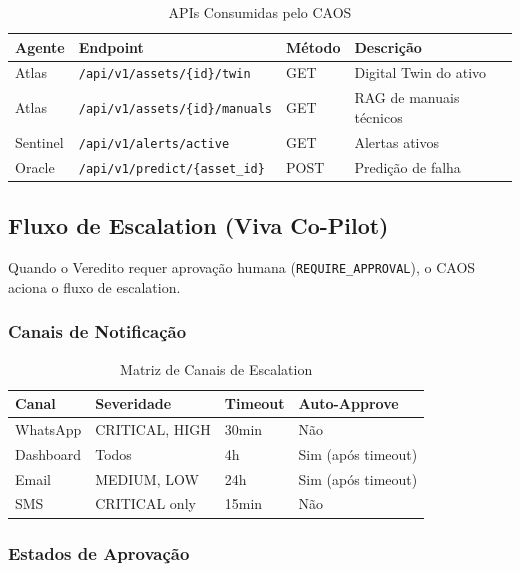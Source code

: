 \documentclass[12pt, a4paper]{article}
\begin{document}
\begin{table}[h!]
\centering
\small
\begin{tabular}{|l|l|l|l|}
\hline
\textbf{Agente} & \textbf{Endpoint} & \textbf{Método} & \textbf{Descrição} \\ \hline
Atlas & \texttt{/api/v1/assets/\{id\}/twin} & GET & Digital Twin do ativo \\ \hline
Atlas & \texttt{/api/v1/assets/\{id\}/manuals} & GET & RAG de manuais técnicos \\ \hline
Sentinel & \texttt{/api/v1/alerts/active} & GET & Alertas ativos \\ \hline
Oracle & \texttt{/api/v1/predict/\{asset\_id\}} & POST & Predição de falha \\ \hline
\end{tabular}
\caption{APIs Consumidas pelo CAOS}
\end{table}

\subsection{Fluxo de Escalation (Viva Co-Pilot)}

Quando o Veredito requer aprovação humana (\texttt{REQUIRE\_APPROVAL}), o CAOS aciona o fluxo de escalation.

\subsubsection{Canais de Notificação}

\begin{table}[h!]
\centering
\small
\begin{tabular}{|l|l|l|l|}
\hline
\textbf{Canal} & \textbf{Severidade} & \textbf{Timeout} & \textbf{Auto-Approve} \\ \hline
WhatsApp & CRITICAL, HIGH & 30min & Não \\ \hline
Dashboard & Todos & 4h & Sim (após timeout) \\ \hline
Email & MEDIUM, LOW & 24h & Sim (após timeout) \\ \hline
SMS & CRITICAL only & 15min & Não \\ \hline
\end{tabular}
\caption{Matriz de Canais de Escalation}
\end{table}

\subsubsection{Estados de Aprovação}
\end{document}
